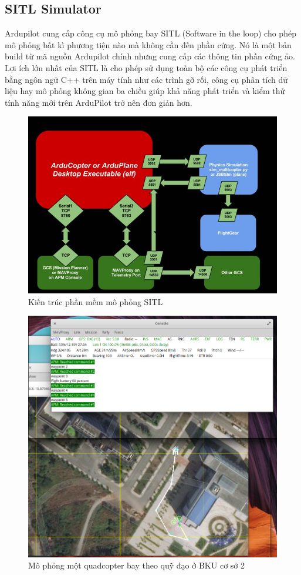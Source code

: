     \subsection{SITL Simulator}
    		Ardupilot cung cấp công cụ mô phỏng bay SITL (Software in the loop) cho phép mô phỏng bất kì phương tiện nào mà không cần đến phần cứng. Nó là một bản build từ mã nguồn Ardupilot chính nhưng cung cấp các thông tin phần cứng ảo. Lợi ích lớn nhất của SITL là cho phép sử dụng toàn bộ các công cụ phát triển bằng ngôn ngữ C++ trên máy tính như các trình gỡ rối, công cụ phân tích dữ liệu hay mô phỏng không gian ba chiều giúp khả năng phát triển và kiểm thử tính năng mới trên ArduPilot trở nên đơn giản hơn. 
    		
    \begin{figure}[h!]
    	\begin{center}
    		\includegraphics[scale=0.35]{images/ArdupilotSoftwareintheLoopSITL.jpg}
    		\caption{Kiến trúc phần mềm mô phỏng SITL}
    	\end{center}
    \end{figure}
    
    \begin{figure}[h!]
    	\begin{center}
    		\includegraphics[scale=0.45]{images/simulating.png}
    		\caption{Mô phỏng một quadcopter bay theo quỹ đạo ở BKU cơ sở 2}
    	\end{center}
    \end{figure}